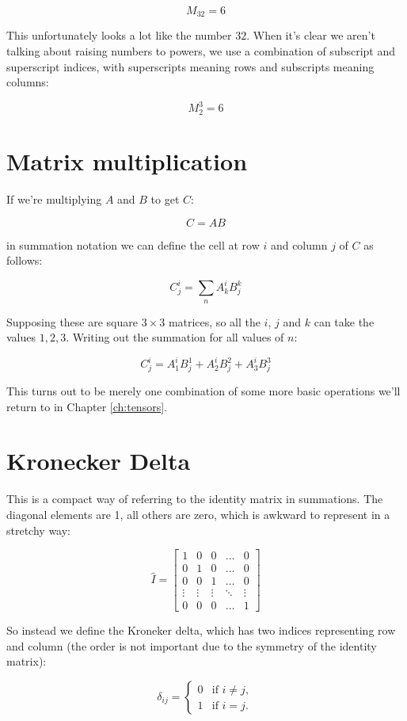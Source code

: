 $$M_{32} = 6$$

This unfortunately looks a lot like the number $32$. When it's clear we aren't talking about raising numbers to powers, we use a combination of subscript and superscript indices, with superscripts meaning rows and subscripts meaning columns:

$$M^3_2 = 6$$

\section{Matrix multiplication}

If we're multiplying $A$ and $B$ to get $C$:

$$C = AB$$

in summation notation we can define the cell at row $i$ and column $j$ of $C$ as follows:

$$C^i_j = \sum_n{A^i_kB^k_j}$$

Supposing these are square $3 \times 3$ matrices, so all the $i$, $j$ and $k$ can take the values $1, 2, 3$. Writing out the summation for all values of $n$:

$$C^i_j = A^i_1B^1_j + A^i_2B^2_j + A^i_3B^3_j $$

This turns out to be merely one combination of some more basic operations we'll return to in Chapter \ref{ch:tensors}.

\section{Kronecker Delta}

This is a compact way of referring to the identity matrix in summations. The diagonal elements are 1, all others are zero, which is awkward to represent in a stretchy way:

$$
\hat{I} = \begin{bmatrix}
1 & 0 & 0 & \dots & 0 \\
0 & 1 & 0 & \dots & 0 \\
0 & 0 & 1 & \dots & 0 \\
\vdots & \vdots & \vdots & \ddots & \vdots\\
0 & 0 & 0 & \dots & 1
\end{bmatrix}
$$

So instead we define the Kroneker delta, which has two indices representing row and column (the order is not important due to the symmetry of the identity matrix):

$$
\delta_{ij} = \begin{cases}
0 &\text{if } i \neq j,   \\
1 &\text{if } i=j.   \end{cases}
$$

